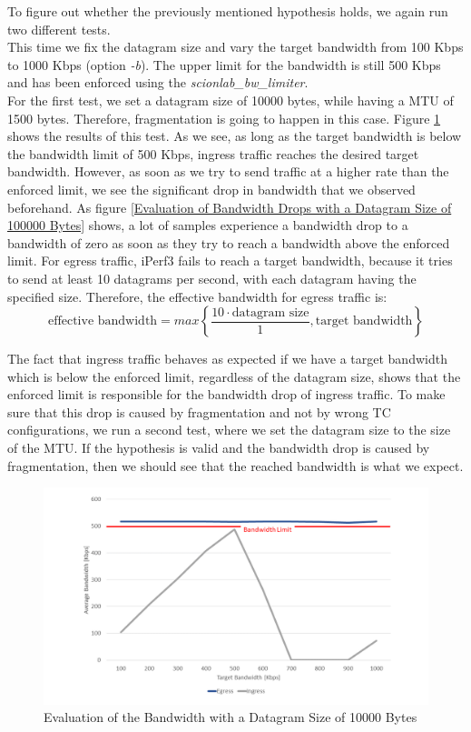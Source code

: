 To figure out whether the previously mentioned hypothesis holds, we again run two different tests.
\\
This time we fix the datagram size and vary the target bandwidth from 100 Kbps to 1000 Kbps (option \textit{-b}). The upper limit for the bandwidth is still 500 Kbps and has been enforced using the \textit{scionlab\_bw\_limiter}. 
\\
For the first test, we set a datagram size of 10000 bytes, while having a \acs{MTU} of 1500 bytes. Therefore, fragmentation is going to happen in this case. Figure \ref{Evaluation of the Bandwidth with a Datagram Size of 10000 Bytes} shows the results of this test. As we see, as long as the target bandwidth is below the bandwidth limit of 500 Kbps, ingress traffic reaches the desired target bandwidth. However, as soon as we try to send traffic at a higher rate than the enforced limit, we see the significant drop in bandwidth that we observed beforehand. As figure \ref{Evaluation of Bandwidth Drops with a Datagram Size of 100000 Bytes} shows, a lot of samples experience a bandwidth drop to a bandwidth of zero as soon as they try to reach a bandwidth above the enforced limit. For egress traffic, iPerf3 fails to reach a target bandwidth, because it tries to send at least 10 datagrams per second, with each datagram having the specified size. Therefore, the effective bandwidth for egress traffic is: 
$$\text{effective bandwidth} = max\left\lbrace\frac{10\cdot \text{datagram size}}{1},\text{target bandwidth}\right\rbrace$$ 

The fact that ingress traffic behaves as expected if we have a target bandwidth which is below the enforced limit, regardless of the datagram size, shows that the enforced limit is responsible for the bandwidth drop of ingress traffic. To make sure that this drop is caused by fragmentation and not by wrong \acs{TC} configurations, we run a second test, where we set the datagram size to the size of the \acs{MTU}. If the hypothesis is valid and the bandwidth drop is caused by fragmentation, then we should see that the reached bandwidth is what we expect.

\begin{figure}[h]
	\centering
	\includegraphics[width=\textwidth]{img/Evaluation-Bandwidth-Big-Buffer.png}
	\caption{Evaluation of the Bandwidth with a Datagram Size of 10000 Bytes}
	\label{Evaluation of the Bandwidth with a Datagram Size of 10000 Bytes}
\end{figure}

